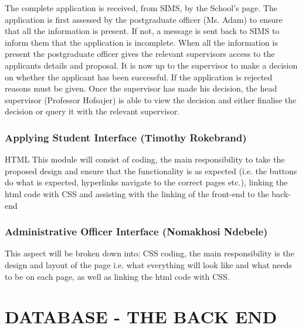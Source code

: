 \documentclass[journal,comsoc]{IEEEtran}
\begin{document}
\hfill \break The complete application is received, from SIMS, by the School's page. The application is first assessed by the postgraduate officer (Ms. Adam) to ensure that all the information is present. If not, a message is sent back to SIMS to inform them that the application is incomplete. When all the information is present the postgraduate officer gives the relevant supervisors access to the applicants details and proposal. It is now up to the supervisor to make a decision on whether the applicant has been successful. If the application is rejected reasons must be given. Once the supervisor has made his decision, the head supervisor (Professor Hofsajer) is able to view the decision and either finalise the decision or query it with the relevant supervisor. \break


\subsubsection{Applying Student Interface (Timothy Rokebrand)}

\hfill \break HTML This module will consist of coding, the main responsibility to take the proposed design and ensure that the functionality is as expected (i.e. the buttons do what is expected, hyperlinks navigate to the correct pages etc.), linking the html code with CSS and assisting with the linking of the front-end to the back-end
\vspace{2mm}


\subsubsection{Administrative Officer Interface (Nomakhosi Ndebele)}

\hfill \break This aspect will be broken down into: CSS coding, the main responsibility is the design and layout of the page i.e. what everything will look like and what needs to be on each page, as well as linking the html code with CSS.


\section{DATABASE - THE BACK END}
\end{document}
